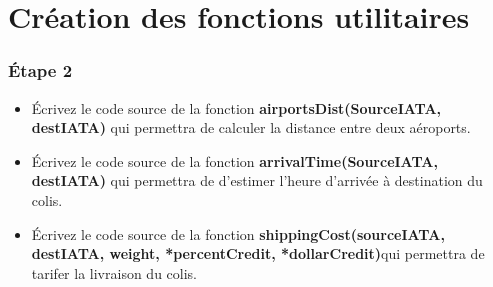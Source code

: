 \section{Création des fonctions utilitaires}
 
\begin{frame}[fragile=singleslide]
  \frametitle{Étape 2}

\begin{itemize}
\item Écrivez le code source de la fonction \textbf{airportsDist(SourceIATA, destIATA)} qui permettra de calculer la distance entre deux aéroports.
\item Écrivez le code source de la fonction \textbf{arrivalTime(SourceIATA, destIATA)} qui permettra de d'estimer l'heure d'arrivée à destination du colis.
\item Écrivez le code source de la fonction \textbf{shippingCost(sourceIATA, destIATA, weight, *percentCredit, *dollarCredit)}qui permettra de tarifer la livraison du colis.
\end{itemize}
\end{frame}


